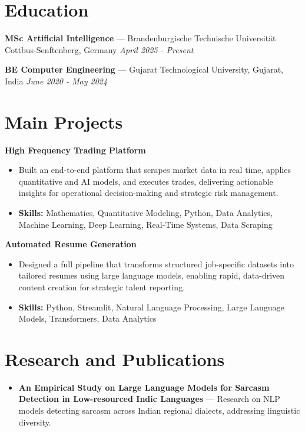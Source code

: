 \documentclass[a4paper,10pt]{article}
\begin{document}
\section*{Education}
\textbf{MSc Artificial Intelligence} — Brandenburgische Technische Universität Cottbus-Senftenberg, Germany \hfill \textit{April 2025 - Present}\par
\vspace{1.5pt}
\textbf{BE Computer Engineering} — Gujarat Technological University, Gujarat, India \hfill \textit{June 2020 - May 2024}\par

\section*{Main Projects}
\textbf{High Frequency Trading Platform}\par
\vspace{1pt}
\begin{itemize}
  \item Built an end-to-end platform that scrapes market data in real time, applies quantitative and AI models, and executes trades, delivering actionable insights for operational decision-making and strategic risk management.
  \item \textbf{Skills:} Mathematics, Quantitative Modeling, Python, Data Analytics, Machine Learning, Deep Learning, Real-Time Systems, Data Scraping
\end{itemize}
\vspace{3pt}
\textbf{Automated Resume Generation}\par
\vspace{1pt}
\begin{itemize}
  \item Designed a full pipeline that transforms structured job-specific datasets into tailored resumes using large language models, enabling rapid, data-driven content creation for strategic talent reporting.
  \item \textbf{Skills:} Python, Streamlit, Natural Language Processing, Large Language Models, Transformers, Data Analytics
\end{itemize}

\section*{Research and Publications}
\begin{itemize}
\item \textbf{An Empirical Study on Large Language Models for Sarcasm Detection in Low-resourced Indic Languages} — Research on NLP models detecting sarcasm across Indian regional dialects, addressing linguistic diversity.
\end{itemize}
\end{document}
